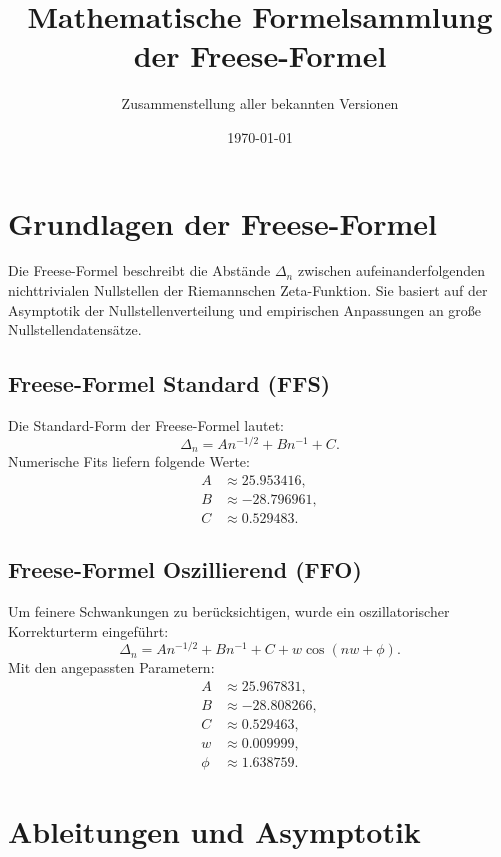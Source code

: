 \documentclass[a4paper,12pt]{article}
\title{Mathematische Formelsammlung der Freese-Formel}
\author{Zusammenstellung aller bekannten Versionen}
\date{\today}
\begin{document}
\maketitle
\tableofcontents
\newpage

\section{Grundlagen der Freese-Formel}

Die Freese-Formel beschreibt die Abstände $\Delta_n$ zwischen aufeinanderfolgenden nichttrivialen Nullstellen der Riemannschen Zeta-Funktion. Sie basiert auf der Asymptotik der Nullstellenverteilung und empirischen Anpassungen an große Nullstellendatensätze.

\subsection{Freese-Formel Standard (FFS)}
Die Standard-Form der Freese-Formel lautet:
\begin{equation}
    \Delta_n = A n^{-1/2} + B n^{-1} + C.
\end{equation}
Numerische Fits liefern folgende Werte:
\begin{align*}
    A &\approx 25.953416, \\
    B &\approx -28.796961, \\
    C &\approx 0.529483.
\end{align*}

\subsection{Freese-Formel Oszillierend (FFO)}
Um feinere Schwankungen zu berücksichtigen, wurde ein oszillatorischer Korrekturterm eingeführt:
\begin{equation}
    \Delta_n = A n^{-1/2} + B n^{-1} + C + w \cos(n w + \phi).
\end{equation}
Mit den angepassten Parametern:
\begin{align*}
    A &\approx 25.967831, \\
    B &\approx -28.808266, \\
    C &\approx 0.529463, \\
    w &\approx 0.009999, \\
    \phi &\approx 1.638759.
\end{align*}

\section{Ableitungen und Asymptotik}
\end{document}
